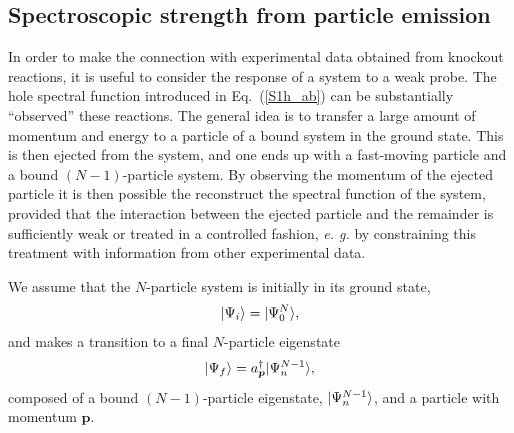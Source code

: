 \subsection{Spectroscopic strength from particle emission}

In order to make the connection with experimental data obtained from
knockout reactions, it is useful to consider the response of a system to a weak
probe. The hole spectral function introduced in Eq.~(\ref{S1h_ab}) can be 
substantially ``observed'' these reactions. The general 
idea is to transfer a large amount of momentum and energy to a 
particle of a bound system in the ground state.
This is then ejected from 
the system, and one ends up with a fast-moving particle and a bound 
$(N-1)$-particle system. By observing the momentum of the ejected 
particle it is then possible the reconstruct the spectral function of the 
system, provided that the interaction between the ejected particle and the 
remainder is sufficiently weak or treated in a controlled fashion,
\textit{e. g.} by constraining this treatment with information from other
experimental data.  

We assume that the  $N$-particle system is initially in its ground 
state,
\begin{equation}
\vert \Psi_i\rangle =\vert \Psi^N_0 \rangle,
\end{equation}
and makes a transition to a final $N$-particle eigenstate 
\begin{equation}
\label{dim:eep1}
\vert \Psi_f\rangle= a^{\dagger}_{\bm p}\vert \Psi^{N-1}_{n}\rangle,
\end{equation}
composed of a bound $(N-1)$-particle eigenstate, 
$\vert \Psi^{N-1}_{n}\rangle$, and a particle with momentum $\bm{p}$.

